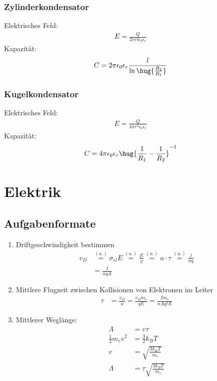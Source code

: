 \documentclass[11pt,letterpaper]{article}
\newcommand\alt{\overset{(a.)}{=}}
\begin{document}
\subsubsection{Zylinderkondensator}
Elektrisches Feld:
\begin{align*}
    E = \frac{Q}{2\pi r l \epsilon_0\epsilon_r}
\end{align*}
Kapazität:
\begin{align*}
    C = 2\pi \epsilon_0\epsilon_r \frac{l}{\ln\hug{\frac{R_2}{R_1}}} 
\end{align*}

\subsubsection{Kugelkondensator}
Elektrisches Feld:
\begin{align*}
    E = \frac{Q}{4\pi r^2 \epsilon_0\epsilon_r}
\end{align*}
Kapazität:
\begin{align*}
    C = 4\pi \epsilon_0\epsilon_r\hug{\frac{1}{R_1} - \frac{1}{R_2}}^{-1} 
\end{align*}

\section{Elektrik}
\subsection{Aufgabenformate}
\begin{enumerate}
    \item Driftgeschwindigkeit bestimmen
    \begin{align*}
        v_D &\alt \sigma_{el} E \alt \frac{E}{\varrho} \alt  a\cdot \tau \alt \frac{j}{n q} \\
        &= \frac{I}{n q A}
    \end{align*}
    \item Mittlere Flugzeit zwischen Kollisionen von Elektronen im Leiter
    \begin{align*}
        \tau &= \frac{v_D}{a} = \frac{v_D m_e}{qE} 
        =\frac{I m_e}{n A q^2 E} 
    \end{align*}
    \item Mittlerer Weglänge:
    \begin{align*}
        \Lambda &=  v \tau\\
        \frac{1}{2}m_e v^2 &= \frac{3}{2}k_B T\\
        v &= \sqrt{\frac{3k_B T}{m_e }}\\
        \Lambda &= \tau \sqrt{\frac{3k_B T}{m_e }}
    \end{align*}
\end{enumerate}
\end{document}
